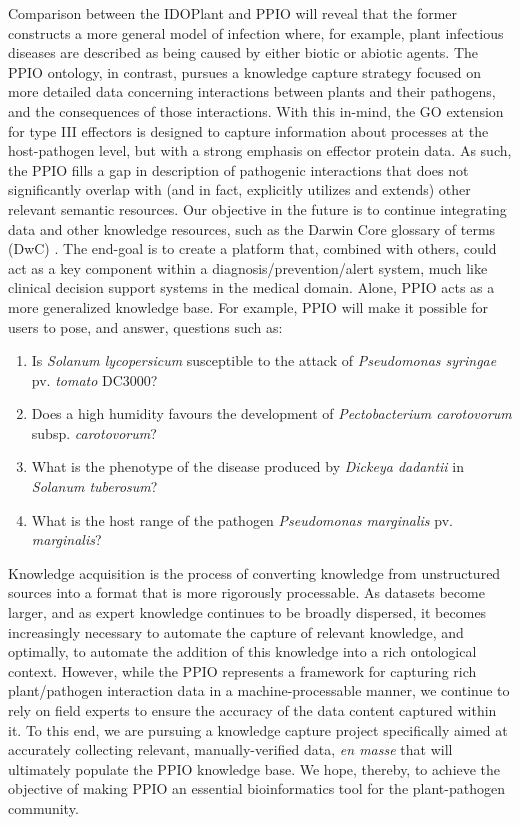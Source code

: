 \documentclass[sw]{iosart2c}
\begin{document}
Comparison between the IDOPlant and PPIO will reveal that the former constructs a more general model of infection where, for example, plant infectious diseases are described as being caused by either biotic or abiotic agents. The PPIO ontology, in contrast, pursues a knowledge capture strategy focused on more detailed data concerning interactions between plants and their pathogens, and the consequences of those interactions. With this in-mind, the GO extension for type III effectors is designed to capture information about processes at the host-pathogen level, but with a strong emphasis on effector protein data. As such, the PPIO fills a gap in description of pathogenic interactions that does not significantly overlap with (and in fact, explicitly utilizes and extends) other relevant semantic resources.  Our objective in the future is to continue integrating data and other knowledge resources, such as the Darwin Core glossary of terms (DwC) \cite{Wieczorek2013}. The end-goal is to create a platform that, combined with others, could act as a key component within a diagnosis/prevention/alert system, much like clinical decision support systems in the medical domain. Alone, PPIO acts as a more generalized knowledge base. For example, PPIO will make it possible for users to pose, and answer, questions such as:

\begin{enumerate}
\item Is {\itshape Solanum lycopersicum} susceptible to the attack of {\itshape Pseudomonas syringae} pv. {\itshape tomato} DC3000?
\item Does a high humidity favours the development of {\itshape Pectobacterium carotovorum} subsp. {\itshape carotovorum}?
\item What is the phenotype of the disease produced by {\itshape Dickeya dadantii} in {\itshape Solanum tuberosum}?
\item What is the host range of the pathogen {\itshape Pseudomonas marginalis} pv. {\itshape marginalis}?

\end{enumerate}

Knowledge acquisition is the process of converting knowledge from unstructured sources into a format that is more rigorously processable. As datasets become larger, and as expert knowledge continues to be broadly dispersed, it becomes increasingly necessary to automate the capture of relevant knowledge, and optimally, to automate the addition of this knowledge into a rich ontological context. However, while the PPIO represents a framework for capturing rich plant/pathogen interaction data in a machine-processable manner, we continue to rely on field experts to ensure the accuracy of the data content captured within it. To this end, we are pursuing a knowledge capture project specifically aimed at accurately collecting relevant, manually-verified data, {\itshape en masse} that will ultimately populate the PPIO knowledge base. We hope, thereby, to achieve the objective of making PPIO an essential bioinformatics tool for the plant-pathogen community.
\end{document}
